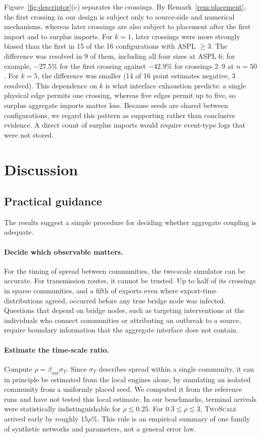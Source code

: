 \documentclass[a4paper,fleqn]{cas-sc}
\newcommand{\TS}{\textup{\textsc{TwoScale}}}
\begin{document}
Figure~\ref{fig:descriptor}(c) separates the crossings. By Remark~\ref{rem:placement}, the first crossing in our design is subject only to source-side and numerical mechanisms, whereas later crossings are also subject to placement after the first import and to surplus imports. For $k=1$, later crossings were more strongly biased than the first in 15 of the 16 configurations with ASPL $\ge3$. The difference was resolved in 9 of them, including all four sizes at ASPL 6; for example, $-27.5\%$ for the first crossing against $-42.9\%$ for crossings 2--9 at $n=50$. For $k=5$, the difference was smaller (14 of 16 point estimates negative, 3 resolved). This dependence on $k$ is what interface exhaustion predicts: a single physical edge permits one crossing, whereas five edges permit up to five, so surplus aggregate imports matter less. Because seeds are shared between configurations, we regard this pattern as supporting rather than conclusive evidence. A direct count of surplus imports would require event-type logs that were not stored.

\section{Discussion}
\label{sec:discussion}

\subsection{Practical guidance}

The results suggest a simple procedure for deciding whether aggregate coupling is adequate.

\paragraph{Decide which observable matters.}
For the timing of spread between communities, the two-scale simulator can be accurate. For transmission routes, it cannot be trusted. Up to half of its crossings in sparse communities, and a fifth of exports even where export-time distributions agreed, occurred before any true bridge node was infected. Questions that depend on bridge nodes, such as targeting interventions at the individuals who connect communities or attributing an outbreak to a source, require boundary information that the aggregate interface does not contain.

\paragraph{Estimate the time-scale ratio.}
Compute $\rho=\beta_{\mathrm{out}}\sigma_T$. Since $\sigma_T$ describes spread within a single community, it can in principle be estimated from the local engines alone, by simulating an isolated community from a uniformly placed seed. We computed it from the reference runs and have not tested this local estimate. In our benchmarks, terminal arrivals were statistically indistinguishable for $\rho\lesssim0.25$. For $0.3\lesssim\rho\lesssim3$, \TS{} arrived early by roughly $15\rho\%$. This rule is an empirical summary of one family of synthetic networks and parameters, not a general error law.
\end{document}
